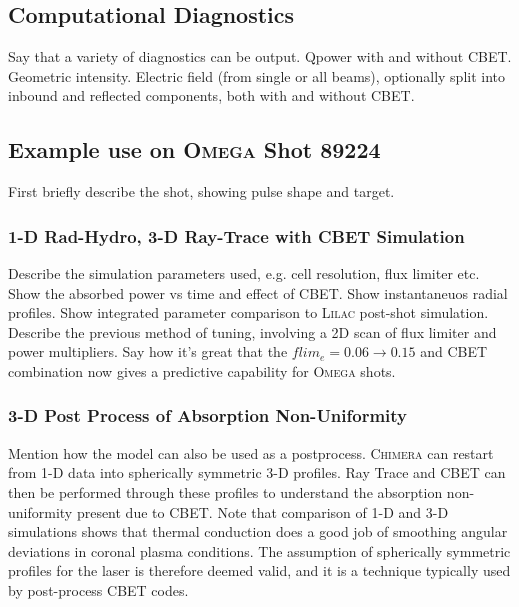 \subsection{Computational Diagnostics}

Say that a variety of diagnostics can be output.
Qpower with and without CBET.
Geometric intensity.
Electric field (from single or all beams), optionally split into inbound and reflected components, both with and without CBET.

\subsection{Example use on \textsc{Omega} Shot 89224}

First briefly describe the shot, showing pulse shape and target.

\subsubsection{1-D Rad-Hydro, 3-D Ray-Trace with CBET Simulation}

Describe the simulation parameters used, e.g. cell resolution, flux limiter etc.
Show the absorbed power vs time and effect of CBET.
Show instantaneuos radial profiles.
Show integrated parameter comparison to \textsc{Lilac} post-shot simulation.
Describe the previous method of tuning, involving a 2D scan of flux limiter and power multipliers.
Say how it's great that the $flim_e = 0.06 \rightarrow 0.15$ and CBET combination now gives a predictive capability for \textsc{Omega} shots.

\subsubsection{3-D Post Process of Absorption Non-Uniformity}

Mention how the model can also be used as a postprocess.
\textsc{Chimera} can restart from 1-D data into spherically symmetric 3-D profiles.
Ray Trace and CBET can then be performed through these profiles to understand the absorption non-uniformity present due to CBET.
Note that comparison of 1-D and 3-D simulations shows that thermal conduction does a good job of smoothing angular deviations in coronal plasma conditions.
The assumption of spherically symmetric profiles for the laser is therefore deemed valid, and it is a technique typically used by post-process CBET codes.

